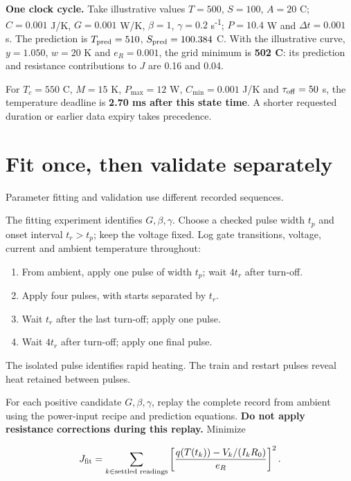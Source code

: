 \documentclass[11pt,letterpaper]{article}
\begin{document}
\textbf{One clock cycle.} Take illustrative values \(T=500\), \(S=100\), \(A=20\) \textdegree{}C; \(C=0.001\) J/K, \(G=0.001\) W/K, \(\beta=1\), \(\gamma=0.2\) s\textsuperscript{-1}; \(P=10.4\) W and \(\Delta t=0.001\) s. The prediction is \(T_{\rm pred}=510\), \(S_{\rm pred}=100.384\) \textdegree{}C. With the illustrative curve, \(y=1.050\), \(w=20\) K and \(e_R=0.001\), the grid minimum is \textbf{502 \textdegree{}C}: its prediction and resistance contributions to \(J\) are 0.16 and 0.04.

For \(T_c=550\) \textdegree{}C, \(M=15\) K, \(P_{\max}=12\) W, \(C_{\min}=0.001\) J/K and \(\tau_{\rm off}=50\) \textmu{}s, the temperature deadline is \textbf{2.70 ms after this state time}. A shorter requested duration or earlier data expiry takes precedence.

\section{Fit once, then validate separately}

Parameter fitting and validation use different recorded sequences.

The fitting experiment identifies \(G,\beta,\gamma\). Choose a checked pulse width \(t_p\) and onset interval \(t_r>t_p\); keep the voltage fixed. Log gate transitions, voltage, current and ambient temperature throughout:

\begin{enumerate}[start=1]
\item From ambient, apply one pulse of width \(t_p\); wait \(4t_r\) after turn-off.
\item Apply four pulses, with starts separated by \(t_r\).
\item Wait \(t_r\) after the last turn-off; apply one pulse.
\item Wait \(4t_r\) after turn-off; apply one final pulse.
\end{enumerate}

The isolated pulse identifies rapid heating. The train and restart pulses reveal heat retained between pulses.

For each positive candidate \(G,\beta,\gamma\), replay the complete record from ambient using the power-input recipe and prediction equations. \textbf{Do not apply resistance corrections during this replay.} Minimize

\[
J_{\rm fit}=\sum_{k\in\text{settled readings}}
\left[\frac{q(T(t_k))-V_k/(I_kR_0)}{e_R}\right]^2.
\]
\end{document}
